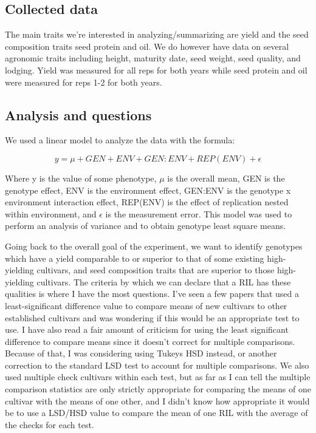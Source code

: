 \documentclass[
]{article}
\begin{document}
\hypertarget{collected-data}{%
\subsection{Collected data}\label{collected-data}}

The main traits we're interested in analyzing/summarizing are yield and
the seed composition traits seed protein and oil. We do however have
data on several agronomic traits including height, maturity date, seed
weight, seed quality, and lodging. Yield was measured for all reps for
both years while seed protein and oil were measured for reps 1-2 for
both years.

\hypertarget{analysis-and-questions}{%
\subsection{Analysis and questions}\label{analysis-and-questions}}

We used a linear model to analyze the data with the formula:

\[y = \mu + GEN + ENV + GEN:ENV + REP(ENV) + \epsilon\]

Where y is the value of some phenotype, \(\mu\) is the overall mean, GEN
is the genotype effect, ENV is the environment effect, GEN:ENV is the
genotype x environment interaction effect, REP(ENV) is the effect of
replication nested within environment, and \(\epsilon\) is the
measurement error. This model was used to perform an analysis of
variance and to obtain genotype least square means.

Going back to the overall goal of the experiment, we want to identify
genotypes which have a yield comparable to or superior to that of some
existing high-yielding cultivars, and seed composition traits that are
superior to those high-yielding cultivars. The criteria by which we can
declare that a RIL has these qualities is where I have the most
questions. I've seen a few papers that used a least-significant
difference value to compare means of new cultivars to other established
cultivars and was wondering if this would be an appropriate test to use.
I have also read a fair amount of criticism for using the least
significant difference to compare means since it doesn't correct for
multiple comparisons. Because of that, I was considering using Tukeys
HSD instead, or another correction to the standard LSD test to account
for multiple comparisons. We also used multiple check cultivars within
each test, but as far as I can tell the multiple comparison statistics
are only strictly appropriate for comparing the means of one cultivar
with the means of one other, and I didn't know how appropriate it would
be to use a LSD/HSD value to compare the mean of one RIL with the
average of the checks for each test.
\end{document}
